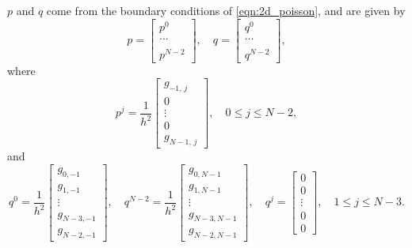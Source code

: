 $p$ and $q$ come from the boundary conditions of \eqref{eqn:2d_poisson}, and are given by 
\[p = \begin{bmatrix} p^0 \\ \ldots \\ \\ p^{N-2} \end{bmatrix}, \quad  q = \begin{bmatrix} q^0 \\ \ldots \\ \\ q^{N-2} \end{bmatrix},\]
where 
\[p^j = \frac{1}{h^2} \begin{bmatrix} g_{-1,\,j} \\ 0 \\ \vdots \\0\\ g_{N-1,\,j} \end{bmatrix} ,\quad 0 \leq j \leq N-2,\]
and 
\[q^0 = \frac{1}{h^2}\begin{bmatrix} g_{0,-1}  \\ g_{1,-1} \\ \vdots \\ g_{N-3,-1}\\ g_{N-2,-1} \end{bmatrix}, \quad q^{N-2} = \frac{1}{h^2}\begin{bmatrix} g_{0,N-1} \\ g_{1,N-1} \\ \vdots \\ g_{N-3,N-1}\\ g_{N-2,N-1} \end{bmatrix}, \quad q^{j} = \begin{bmatrix} 0 \\ 0 \\ \vdots \\ 0 \\ 0 \end{bmatrix} ,\quad 1 \leq j \leq N-3.\]


